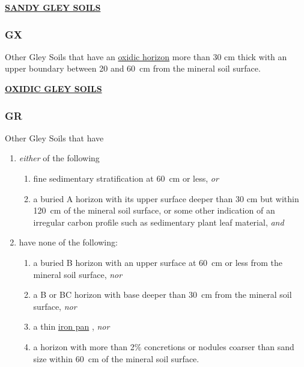 \documentclass[
  letterpaper,
  DIV=11,
  numbers=noendperiod]{scrreprt}
\providecommand{\tightlist}{%
  \setlength{\itemsep}{0pt}\setlength{\parskip}{0pt}}\usepackage{longtable,booktabs,array}
\begin{document}
\protect\hyperlink{sec-GS}{\textbf{SANDY GLEY SOILS}}

\hypertarget{sec-key-GX}{%
\subsubsection{\texorpdfstring{\textbf{GX}}{GX}}\label{sec-key-GX}}

Other Gley Soils that have an \protect\hyperlink{sec-diag-oxh}{oxidic
horizon} more than 30 cm thick with an upper boundary between 20 and
60~cm from the mineral soil surface.

\protect\hyperlink{sec-GX}{\textbf{OXIDIC GLEY SOILS}}

\hypertarget{sec-key-GR}{%
\subsubsection{\texorpdfstring{\textbf{GR}}{GR}}\label{sec-key-GR}}

Other Gley Soils that have

\begin{enumerate}
\def\labelenumi{\arabic{enumi}.}
\tightlist
\item
  \emph{either} of the following

  \begin{enumerate}
  \def\labelenumii{(\alph{enumii})}
  \tightlist
  \item
    fine sedimentary stratification at 60~cm or less, \emph{or}
  \item
    a buried A horizon with its upper surface deeper than 30 cm but
    within 120~cm of the mineral soil surface, or some other indication
    of an irregular carbon profile such as sedimentary plant leaf
    material, \emph{and}
  \end{enumerate}
\item
  have none of the following:

  \begin{enumerate}
  \def\labelenumii{(\alph{enumii})}
  \tightlist
  \item
    a buried B horizon with an upper surface at 60~cm or less from the
    mineral soil surface, \emph{nor}
  \item
    a B or BC horizon with base deeper than 30~cm from the mineral soil
    surface, \emph{nor}
  \item
    a thin \protect\hyperlink{sec-diag-ipan}{iron pan} , \emph{nor}
  \item
    a horizon with more than 2\% concretions or nodules coarser than
    sand size within 60~cm of the mineral soil surface.
  \end{enumerate}
\end{enumerate}
\end{document}
